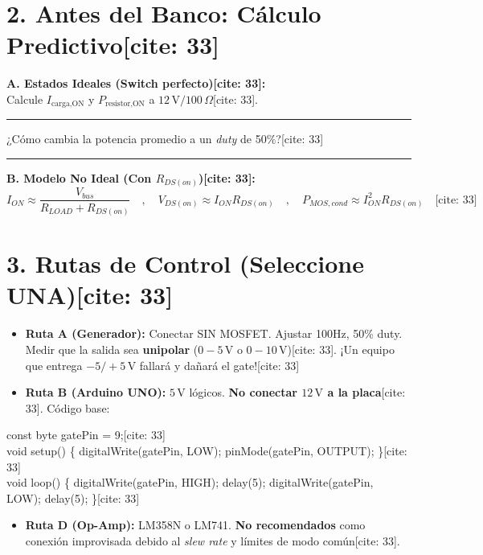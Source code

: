 \documentclass[11pt, a4paper]{article}
\begin{document}
\section*{2. Antes del Banco: Cálculo Predictivo[cite: 33]}
\textbf{A. Estados Ideales (Switch perfecto)[cite: 33]:} \\
Calcule $I_{\text{carga,ON}}$ y $P_{\text{resistor,ON}}$ a $12\,\text{V}/100\,\Omega$[cite: 33].
\vspace{0.2cm}
\hrule
\vspace{0.3cm}
¿Cómo cambia la potencia promedio a un \textit{duty} de 50\%?[cite: 33]
\vspace{0.2cm}
\hrule
\vspace{0.4cm}

\textbf{B. Modelo No Ideal (Con $R_{DS(on)}$)[cite: 33]:}
\begin{equation*}
    I_{ON} \approx \frac{V_{bus}}{R_{LOAD} + R_{DS(on)}} \quad , \quad V_{DS(on)} \approx I_{ON} R_{DS(on)} \quad , \quad P_{MOS,cond} \approx I_{ON}^2 R_{DS(on)} \quad \text{[cite: 33]}
\end{equation*}

\section*{3. Rutas de Control (Seleccione UNA)[cite: 33]}
\begin{itemize}
    \setlength\itemsep{0.3em}
    \item \textbf{Ruta A (Generador):} Conectar SIN MOSFET. Ajustar 100Hz, 50\% duty. Medir que la salida sea \textbf{unipolar} ($0-5\,\text{V}$ o $0-10\,\text{V}$)[cite: 33]. ¡Un equipo que entrega $-5/+5\,\text{V}$ fallará y dañará el gate![cite: 33]
    \item \textbf{Ruta B (Arduino UNO):} $5\,\text{V}$ lógicos. \textbf{No conectar $12\,\text{V}$ a la placa}[cite: 33]. Código base:
\end{itemize}

\begin{tcolorbox}[colback=black!5, colframe=black, fontupper=\ttfamily, sharp corners]
const byte gatePin = 9;[cite: 33] \\
void setup() \{ digitalWrite(gatePin, LOW); pinMode(gatePin, OUTPUT); \}[cite: 33] \\
void loop() \{ digitalWrite(gatePin, HIGH); delay(5); digitalWrite(gatePin, LOW); delay(5); \}[cite: 33]
\end{tcolorbox}

\begin{itemize}
    \item \textbf{Ruta D (Op-Amp):} LM358N o LM741. \textbf{No recomendados} como conexión improvisada debido al \textit{slew rate} y límites de modo común[cite: 33].
\end{itemize}
\end{document}
